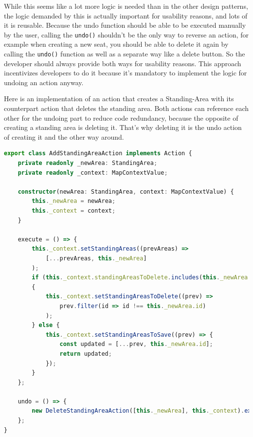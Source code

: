 While this seems like a lot more logic is needed than in the other design patterns, the logic demanded by this is actually important for usability reasons, and lots of it is reusable. Because the undo function should be able to be executed manually by the user, calling the \texttt{undo()} shouldn't be the only way to reverse an action, for example when creating a new seat, you should be able to delete it again by calling the \texttt{undo()} function as well as a separate way like a delete button. So the developer should always provide both ways for usability reasons. This approach incentivizes developers to do it because it's mandatory to implement the logic for undoing an action anyway.

Here is an implementation of an action that creates a Standing-Area with its counterpart action that deletes the standing area. Both actions can reference each other for the undoing part to reduce code redundancy, because the opposite of creating a standing area is deleting it. That's why deleting it is the undo action of creating it and the other way around.

\begin{lstlisting}[language=TypeScript,caption={Add standing-area action implementation},label={lst:add-standing-area-action-implementation}]
export class AddStandingAreaAction implements Action {
    private readonly _newArea: StandingArea;
    private readonly _context: MapContextValue;

    constructor(newArea: StandingArea, context: MapContextValue) {
        this._newArea = newArea;
        this._context = context;
    }

    execute = () => {
        this._context.setStandingAreas((prevAreas) => 
            [...prevAreas, this._newArea]
        );
        if (this._context.standingAreasToDelete.includes(this._newArea.id))
        {
            this._context.setStandingAreasToDelete((prev) =>
                prev.filter(id => id !== this._newArea.id)
            );
        } else {
            this._context.setStandingAreasToSave((prev) => {
                const updated = [...prev, this._newArea.id];
                return updated;
            });
        }
    };

    undo = () => {
        new DeleteStandingAreaAction([this._newArea], this._context).execute()
    };
}
\end{lstlisting}

